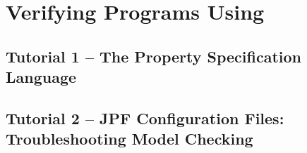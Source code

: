 %
\chapter{Verifying Programs Using \ajpf}


\section{Tutorial 1 -- The Property Specification Language}

{
  \let\section\subsection
  \let\subsection\subsubsection
  \let\subsubsection\paragraph

  
  }

\section{Tutorial 2 -- JPF Configuration Files: Troubleshooting Model Checking}

{
  \let\section\subsection
  \let\subsection\subsubsection
  \let\subsubsection\paragraph

  
  }

